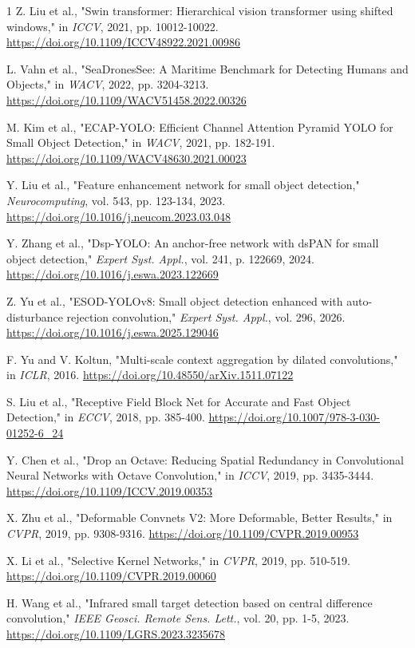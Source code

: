 \documentclass[lettersize,journal]{IEEEtran}
\begin{document}
\begin{thebibliography}{1}
 Z. Liu et al., "Swin transformer: Hierarchical vision transformer using shifted windows," in \textit{ICCV}, 2021, pp. 10012-10022. \url{https://doi.org/10.1109/ICCV48922.2021.00986}

 L. Vahn et al., "SeaDronesSee: A Maritime Benchmark for Detecting Humans and Objects," in \textit{WACV}, 2022, pp. 3204-3213. \url{https://doi.org/10.1109/WACV51458.2022.00326}

 M. Kim et al., "ECAP-YOLO: Efficient Channel Attention Pyramid YOLO for Small Object Detection," in \textit{WACV}, 2021, pp. 182-191. \url{https://doi.org/10.1109/WACV48630.2021.00023}

 Y. Liu et al., "Feature enhancement network for small object detection," \textit{Neurocomputing}, vol. 543, pp. 123-134, 2023. \url{https://doi.org/10.1016/j.neucom.2023.03.048}

 Y. Zhang et al., "Dsp-YOLO: An anchor-free network with dsPAN for small object detection," \textit{Expert Syst. Appl.}, vol. 241, p. 122669, 2024. \url{https://doi.org/10.1016/j.eswa.2023.122669}

 Z. Yu et al., "ESOD-YOLOv8: Small object detection enhanced with auto-disturbance rejection convolution," \textit{Expert Syst. Appl.}, vol. 296, 2026. \url{https://doi.org/10.1016/j.eswa.2025.129046}

 F. Yu and V. Koltun, "Multi-scale context aggregation by dilated convolutions," in \textit{ICLR}, 2016. \url{https://doi.org/10.48550/arXiv.1511.07122}

 S. Liu et al., "Receptive Field Block Net for Accurate and Fast Object Detection," in \textit{ECCV}, 2018, pp. 385-400. \url{https://doi.org/10.1007/978-3-030-01252-6_24}

 Y. Chen et al., "Drop an Octave: Reducing Spatial Redundancy in Convolutional Neural Networks with Octave Convolution," in \textit{ICCV}, 2019, pp. 3435-3444. \url{https://doi.org/10.1109/ICCV.2019.00353}

 X. Zhu et al., "Deformable Convnets V2: More Deformable, Better Results," in \textit{CVPR}, 2019, pp. 9308-9316. \url{https://doi.org/10.1109/CVPR.2019.00953}

 X. Li et al., "Selective Kernel Networks," in \textit{CVPR}, 2019, pp. 510-519. \url{https://doi.org/10.1109/CVPR.2019.00060}

 H. Wang et al., "Infrared small target detection based on central difference convolution," \textit{IEEE Geosci. Remote Sens. Lett.}, vol. 20, pp. 1-5, 2023. \url{https://doi.org/10.1109/LGRS.2023.3235678}


\end{thebibliography}
\end{document}
